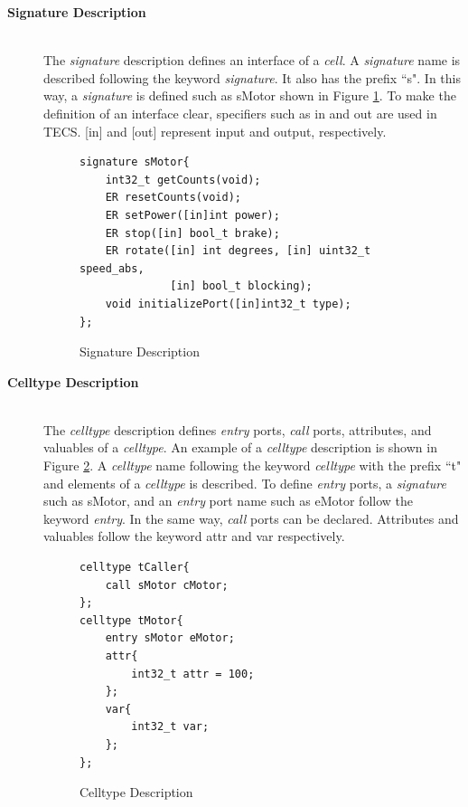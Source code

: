\documentclass[conference,compsoc]{IEEEtran}
\begin{document}
\begin{description}
    \item[{\bf Signature Description}]\mbox{}\\
        The {\it signature} description defines an interface of a {\it cell}.
        A {\it signature} name is described following the keyword {\it signature}.
        It also has the prefix ``s".
        In this way, a {\it signature} is defined such as sMotor shown in Figure \ref{signature}.
        To make the definition of an interface clear, specifiers such as in and out are used in TECS.
        [in] and [out] represent input and output, respectively.\\
\begin{figure}[t]
\centering
\begin{lstlisting}
signature sMotor{
    int32_t getCounts(void);
    ER resetCounts(void);
    ER setPower([in]int power);
    ER stop([in] bool_t brake);
    ER rotate([in] int degrees, [in] uint32_t speed_abs,
              [in] bool_t blocking);
    void initializePort([in]int32_t type);
};
\end{lstlisting}
\caption{Signature Description}
\label{signature}
\end{figure}

    \item[{\bf Celltype Description}]\mbox{}\\
        The {\it celltype} description defines {\it entry} ports, {\it call} ports, attributes, and valuables of a {\it celltype}.
        An example of a {\it celltype} description is shown in Figure \ref{celltype}.
        A {\it celltype} name following the keyword {\it celltype} with the prefix ``t" and elements of a {\it celltype} is described.
        To define {\it entry} ports, a {\it signature} such as sMotor, and an {\it entry} port name such as eMotor follow the keyword {\it entry}.
        In the same way, {\it call} ports can be declared.
        Attributes and valuables follow the keyword attr and var respectively.\\
\begin{figure}[t]
\centering
\begin{lstlisting}
celltype tCaller{
    call sMotor cMotor;
};
celltype tMotor{
    entry sMotor eMotor;
    attr{
        int32_t attr = 100;
    };
    var{
        int32_t var;
    };
};
\end{lstlisting}
\caption{Celltype Description}
\label{celltype}
\end{figure}


\end{description}
\end{document}
